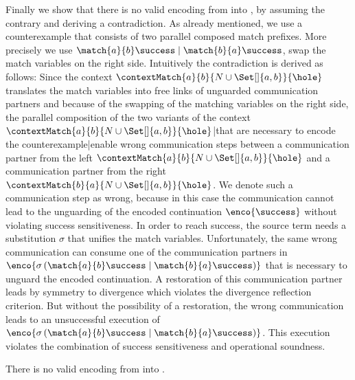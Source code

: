 \documentclass[]{article}
\begin{document}
Finally we show that there is no valid encoding from \piT into \piNM, by assuming the contrary and deriving a contradiction. As already mentioned, we use a counterexample that consists of two parallel composed match prefixes. More precisely we use $ \match{a}{b}\success \mid \match{b}{a}\success $, \ie swap the match variables on the right side. Intuitively the contradiction is derived as follows: Since the context $ \contextMatch{a}{b}{N \cup \Set[]{ a, b }}{\hole} $ translates the match variables into free links of unguarded communication partners and because of the swapping of the matching variables on the right side, the parallel composition of the two variants of the context $ \contextMatch{a}{b}{N \cup \Set[]{ a, b }}{\hole} $|that are necessary to encode the counterexample|enable wrong communication steps between a communication partner from the left $ \contextMatch{a}{b}{N \cup \Set[]{ a, b }}{\hole} $ and a communication partner from the right $ \contextMatch{b}{a}{N \cup \Set[]{ a, b }}{\hole} $. We denote such a communication step as wrong, because in this case the communication cannot lead to the unguarding of the encoded continuation $ \enco{\success} $ without violating success sensitiveness. In order to reach success, the source term needs a substitution $ \sigma $ that unifies the match variables. Unfortunately, the same wrong communication can consume one of the communication partners in $ \enco{\sigma\left( \match{a}{b}\success \mid \match{b}{a}\success \right)} $ that is necessary to unguard the encoded continuation. A restoration of this communication partner leads by symmetry to divergence which violates the divergence reflection criterion. But without the possibility of a restoration, the wrong communication leads to an unsuccessful execution of $ \enco{\sigma\left( \match{a}{b}\success \mid \match{b}{a}\success \right)} $. This execution violates the combination of success sensitiveness and operational soundness.

\begin{theorem}
	\label{thm:noEnc}
	There is no valid encoding from \piT into \piNM.
\end{theorem}
\end{document}
